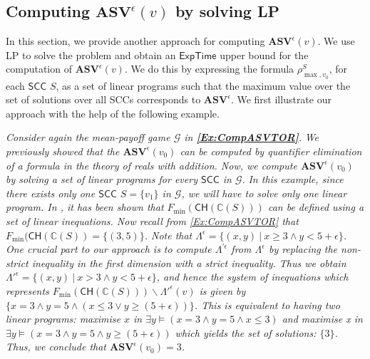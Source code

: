 \subsection{Computing $\mathbf{ASV}^{\epsilon}(v)$ by solving LP}
In this section, we provide another approach for computing $\mathbf{ASV}^{\epsilon}(v)$.
We use LP to solve the problem and obtain an $\mathsf{ExpTime}$ upper bound for the computation of $\mathbf{ASV}^{\epsilon}(v)$.
We do this by expressing the formula $\rho^S_{\max,v_0}$, for each $\mathsf{SCC}$ $S$, as a set of linear programs such that the maximum value over the set of solutions over all {\sf SCC}s corresponds to $\mathbf{ASV}^{\epsilon}$. 
We first illustrate our approach with the help of the following example.
\begin{example}
\label{Ex:CompASVLP}
\emph{Consider again
the mean-payoff game $\mathcal{G}$ in \textbf{\cref{Ex:CompASVTOR}}.}
\emph{We previously showed that the $\mathbf{ASV}^{\epsilon}(v_0)$ can be computed by quantifier elimination of a formula in the theory of reals with addition. Now, we compute $\mathbf{ASV}^{\epsilon}(v_0)$ by solving a set of linear programs for every $\mathsf{SCC}$ in $\mathcal{G}$.}
\emph{In this example, since there exists only one $\mathsf{SCC}$ $S = \{v_1\}$ in $\mathcal{G}$, we will have to solve only one linear program. 
In \cite{CDEHR10}, it has been shown that $F_{\min}(\mathsf{CH}(\mathbb{C}(S)))$ can be defined using a set of linear inequations.
Now recall from \cref{Ex:CompASVTOR} that $F_{\min}(\mathsf{CH}(\mathbb{C}(S))=\{(3,5)\}$.
Note that $\Lambda^{\epsilon} = \{(x,y) \:|\: x \geqslant 3 \land y < 5 + \epsilon \}$.
One crucial part to our approach is to compute $\Lambda^{'\epsilon}$ from $\Lambda^{\epsilon}$ by replacing the non-strict inequality in the first dimension with a strict inequality.
Thus we obtain $\Lambda'^{\epsilon} = \{(x,y) \:|\: x > 3 \land y < 5 + \epsilon \}$, and hence the system of inequations which represents $F_{\min}(\mathsf{CH}(\mathbb{C}(S))) \backslash \Lambda'^{\epsilon}(v)$ is given by $\{ x = 3 \land y = 5 \land (x \leqslant 3 \lor y \geqslant (5 + \epsilon)) \}$. 
This is equivalent to having two linear programs: \textit{maximise $x$ in $\exists y \models (x = 3 \land y = 5 \land x \leqslant 3)$} and \textit{maximise x in $\exists y \models (x = 3 \land y = 5 \land y \geqslant (5 + \epsilon))$} which yields the set of solutions: $\{3\}$. Thus, we conclude that $\mathbf{ASV}^{\epsilon}(v_0) = 3$.}
\end{example}

